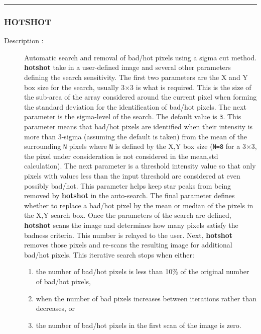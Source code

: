 \hrule 
\subsubsection*{\label{HOTSHOT}HOTSHOT}

\begin{description}

\item[Description :] Automatic search and removal of bad/hot pixels
using a sigma cut method.  {\bf hotshot} take in a user-defined image
and several other parameters defining the search sensitivity.  The
first two parameters are the X and Y box size for the search, usually
3$\times$3 is what is required.  This is the size of the sub-area of
the array considered around the current pixel when forming the standard
deviation for the identification of bad/hot pixels.  The next parameter
is the sigma-level of the search.  The default value is {\tt 3}.  This
parameter means that bad/hot pixels are identified when their intensity
is more than 3-sigma (assuming the default is taken) from the mean of
the surrounding {\tt N} pixels where {\tt N} is defined by the X,Y box
size ({\tt N=8} for a 3$\times$3, the pixel under consideration is not
considered in the mean,std calculation).  The next parameter is a
threshold intensity value so that only pixels with values less than the
input threshold are considered at even possibly bad/hot.  This
parameter helps keep star peaks from being removed by {\bf hotshot} in
the auto-search.  The final parameter defines whether to replace a
bad/hot pixel by the mean or median of the pixels in the X,Y search
box.  Once the parameters of the search are defined, {\bf hotshot}
scans the image and determines how many pixels satisfy the badness
criteria.  This number is relayed to the user.  Next, {\bf hotshot}
removes those pixels and re-scans the resulting image for additional
bad/hot pixels.  This iterative search stops when either:

\begin{enumerate}

\item the number of bad/hot pixels is less than 10\% of the original
number of bad/hot pixels, 

\item when the number of bad pixels increases between iterations rather
than decreases, or

\item the number of bad/hot pixels in the first scan of the image is zero.


\end{enumerate}
\end{description}
